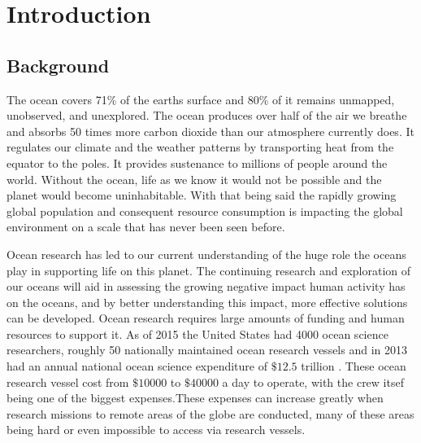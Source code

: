 \graphicspath{{introduction/fig/}}

\chapter{Introduction}
\label{chap:introduction}

\section{Background}
The ocean covers 71$\%$ of the earths surface and 80$\%$ of it remains unmapped, unobserved, and unexplored. The ocean produces over half of the air we 
breathe and absorbs 50 times more carbon dioxide than our atmosphere currently does. It regulates our climate and the weather patterns by transporting heat
 from the equator to the poles. It provides sustenance to millions of people around the world.
   Without 
  the ocean, life as we know it would not be possible and the planet would become uninhabitable.
With that being said 
the rapidly growing global population and consequent resource consumption is impacting 
the global environment 
on a scale that has never been seen before.

Ocean research has led to our current understanding of the huge role the oceans play in supporting life on this planet. The continuing research and 
exploration of our oceans will aid in assessing the growing negative impact human activity has on the oceans, and by better understanding this impact, 
more effective solutions can be developed. Ocean research requires large amounts of funding and human resources to support it. As of 2015 the United States 
had 4000 ocean science researchers, roughly 50 nationally maintained ocean research vessels and in 2013 had an annual national ocean science expenditure of
$\$12.5$ trillion \cite{Valdes}. These ocean research vessel cost from $\$10000$ to $\$40000$ a day to operate, with the crew itsef being one of the biggest 
expenses\cite{Valdes}.These expenses can increase greatly when research missions to remote areas of the globe are conducted, many of these areas being hard 
or even impossible to access via research vessels. 

